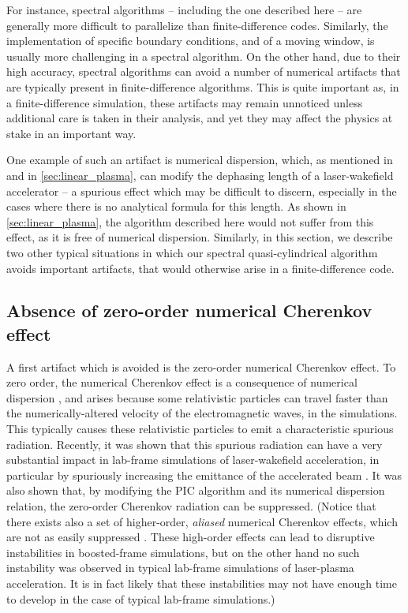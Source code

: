 \documentclass[1p,times,authoryear]{elsarticle}
\begin{document}
For instance, spectral algorithms -- including the one described here
-- are generally more difficult to parallelize than finite-difference
codes. Similarly, the implementation of specific boundary
conditions, and of a moving window, is usually more challenging in a
spectral algorithm. On the other hand, due to their high accuracy,
spectral algorithms can avoid a
number of numerical artifacts that are typically present in
finite-difference algorithms. This is quite important as, in a
finite-difference simulation, these artifacts may remain unnoticed
unless additional care is taken in their analysis, and yet they may
affect the physics at stake in an important way.

One example of such an artifact is numerical dispersion, which, as
mentioned in \citep{CowanPRSTAB2013} and in \cref{sec:linear_plasma}, 
can modify the dephasing length of a laser-wakefield accelerator -- a
spurious effect which
may be difficult to discern, especially in the cases where there is no
analytical formula for this length. As shown in
\cref{sec:linear_plasma}, the algorithm described here would not suffer
from this effect, as it is free of numerical dispersion. Similarly, in
this section, we describe two other typical situations in which our spectral
quasi-cylindrical algorithm avoids important artifacts, that would otherwise
arise in a finite-difference code. 

\subsection{Absence of zero-order numerical Cherenkov effect}

A first artifact which is avoided is the zero-order numerical
Cherenkov effect. To zero order, the numerical Cherenkov effect is a 
consequence of numerical dispersion \citep{GodfreyJCP1974}, and arises 
because some relativistic particles can
travel faster than the numerically-altered velocity of the
electromagnetic waves, in the simulations. This typically causes these
relativistic particles to emit a characteristic spurious
radiation. Recently, it was shown that this spurious radiation
can have a very substantial impact in
lab-frame simulations of laser-wakefield acceleration, 
in particular by spuriously increasing the
emittance of the accelerated beam \citep{LehePRSTAB2013}. It
was also shown that, by modifying the PIC algorithm and its
numerical dispersion relation, the zero-order Cherenkov radiation can be
suppressed. (Notice that there exists also a set of higher-order,
\emph{aliased} numerical Cherenkov effects, which are not as easily
suppressed \citep{GodfreyJCP2013,XuCPC2013,GodfreyJCP2014,
GodfreyIEEE2014,YuJCP2014,YuCPC2015,GodfreyCPC2015}. 
These high-order effects can lead to
disruptive instabilities in boosted-frame simulations, but on the
other hand no such instability was observed in typical lab-frame
simulations of laser-plasma acceleration. 
It is in fact likely that these instabilities may not have enough time to
develop in the case of typical lab-frame simulations.) 
\end{document}
